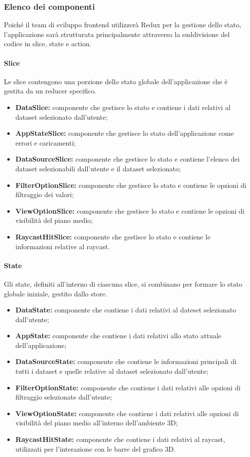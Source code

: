 \subsubsection{Elenco dei componenti}
Poiché il team di sviluppo frontend utilizzerà Redux per la gestione dello stato, l'applicazione sarà strutturata principalmente attraverso la suddivisione del codice in slice, state e action.
\paragraph{Slice}
    Le slice contengono una porzione dello stato globale dell’applicazione che è gestita da un reducer
    specifico.
\begin{itemize}
        \item \textbf{DataSlice:} componente che gestisce lo stato e contiene i dati relativi al dataset selezionato dall'utente;
        \item \textbf{AppStateSlice:} componente che gestisce lo stato dell'applicazione come errori e caricamenti;
        \item \textbf{DataSourceSlice:} componente che gestisce lo stato e contiene l'elenco dei dataset selezionabili dall'utente e il dataset selezionato;
        \item \textbf{FilterOptionSlice:} componente che gestisce lo stato e contiene le opzioni di filtraggio dei valori;
        \item \textbf{ViewOptionSlice:} componente che gestisce lo stato e contiene le opzioni di visibilità del piano medio;
        \item \textbf{RaycastHitSlice:} componente che gestisce lo stato e contiene le informazioni relative al raycast.
\end{itemize}
\paragraph{State}
    Gli state, definiti all'interno di ciascuna slice, si combinano per formare lo stato globale iniziale, gestito dallo store.
    \begin{itemize}
        \item \textbf{DataState:} componente che contiene i dati relativi al dateset selezionato dall'utente;
        \item \textbf{AppState:} componente che contiene i dati relativi allo stato attuale dell'applicazione;
        \item \textbf{DataSourceState:} componente che contiene le informazioni principali di tutti i dataset e quelle relative al dataset selezionato dall'utente;
        \item \textbf{FilterOptionState:} componente che contiene i dati relativi alle opzioni di filtraggio selezionate dall'utente;
        \item \textbf{ViewOptionState:} componente che contiene i dati relativi alle opzioni di visibilità del piano medio all'interno dell'ambiente 3D;
        \item \textbf{RaycastHitState:} componente che contiene i dati relativi al raycast, utilizzati per l'interazione con le barre del grafico 3D.
    \end{itemize}
